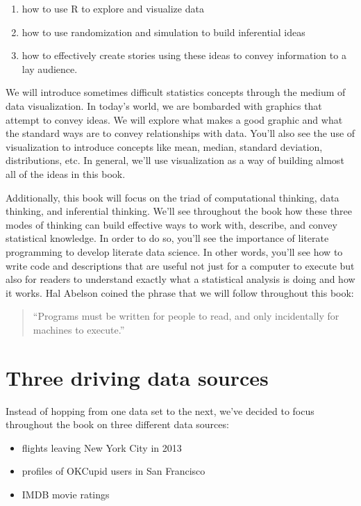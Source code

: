 \documentclass[]{tufte-book}
\providecommand{\tightlist}{%
  \setlength{\itemsep}{0pt}\setlength{\parskip}{0pt}}
\begin{document}
\begin{enumerate}
\def\labelenumi{\arabic{enumi}.}
\tightlist
\item
  how to use R to explore and visualize data
\item
  how to use randomization and simulation to build inferential ideas
\item
  how to effectively create stories using these ideas to convey
  information to a lay audience.
\end{enumerate}

We will introduce sometimes difficult statistics concepts through the
medium of data visualization. In today's world, we are bombarded with
graphics that attempt to convey ideas. We will explore what makes a good
graphic and what the standard ways are to convey relationships with
data. You'll also see the use of visualization to introduce concepts
like mean, median, standard deviation, distributions, etc. In general,
we'll use visualization as a way of building almost all of the ideas in
this book.

Additionally, this book will focus on the triad of computational
thinking, data thinking, and inferential thinking. We'll see throughout
the book how these three modes of thinking can build effective ways to
work with, describe, and convey statistical knowledge. In order to do
so, you'll see the importance of literate programming to develop
literate data science. In other words, you'll see how to write code and
descriptions that are useful not just for a computer to execute but also
for readers to understand exactly what a statistical analysis is doing
and how it works. Hal Abelson coined the phrase that we will follow
throughout this book:

\begin{quote}
``Programs must be written for people to read, and only incidentally for
machines to execute.''
\end{quote}

\section{Three driving data sources}\label{three-driving-data-sources}

Instead of hopping from one data set to the next, we've decided to focus
throughout the book on three different data sources:

\begin{itemize}
\tightlist
\item
  flights leaving New York City in 2013
\item
  profiles of OKCupid users in San Francisco
\item
  IMDB movie ratings
\end{itemize}
\end{document}
